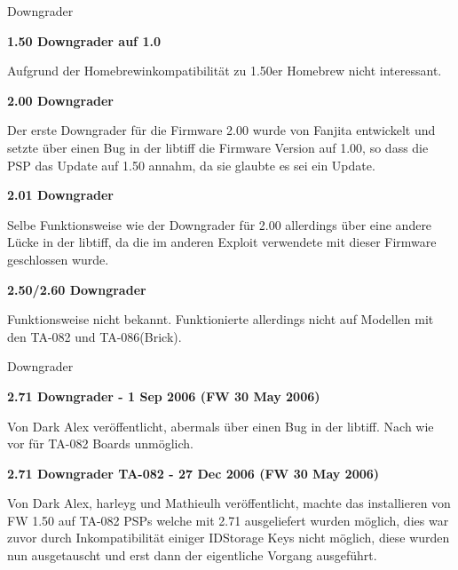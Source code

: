 \documentclass[mode=print,paper=screen,size=10pt,style=paintings]{powerdot}
\begin{document}
\begin{slide}{Downgrader}
	\begin{large}\textbf{1.50 Downgrader auf 1.0}\end{large}\linebreak
	Aufgrund der Homebrewinkompatibilität zu 1.50er Homebrew nicht interessant.\linebreak
	\linebreak
	\begin{large}\textbf{2.00 Downgrader}\end{large}\linebreak
	Der erste Downgrader für die Firmware 2.00 wurde von Fanjita entwickelt und setzte über einen Bug in der libtiff die
	Firmware Version auf 1.00, so dass die PSP das Update auf 1.50 annahm, da sie glaubte es sei ein Update.\linebreak
	\linebreak
	\begin{large}\textbf{2.01 Downgrader}\end{large}\linebreak
	Selbe Funktionsweise wie der Downgrader für 2.00 allerdings über eine andere Lücke in der libtiff, da die im anderen
	Exploit verwendete mit dieser Firmware geschlossen wurde.\linebreak
	\linebreak
	\begin{large}\textbf{2.50/2.60 Downgrader}\end{large}\linebreak
	Funktionsweise nicht bekannt. Funktionierte allerdings nicht auf Modellen mit den TA-082 und TA-086(Brick).
\end{slide}

\begin{slide}{Downgrader}
	\begin{large}\textbf{2.71 Downgrader - 1 Sep 2006 (FW 30 May 2006)}\end{large}\linebreak
	Von Dark Alex veröffentlicht, abermals über einen Bug in der libtiff. Nach wie vor für TA-082 Boards unmöglich.\linebreak
	\linebreak
	\begin{large}\textbf{2.71 Downgrader TA-082 - 27 Dec 2006 (FW 30 May 2006)}\end{large}\linebreak
	Von Dark Alex, harleyg und Mathieulh veröffentlicht, machte das installieren von FW 1.50 auf TA-082 PSPs welche mit
	2.71 ausgeliefert wurden möglich, dies war zuvor durch Inkompatibilität einiger IDStorage Keys nicht möglich, diese
	wurden nun ausgetauscht und erst dann der eigentliche Vorgang ausgeführt.
\end{slide}
\end{document}
